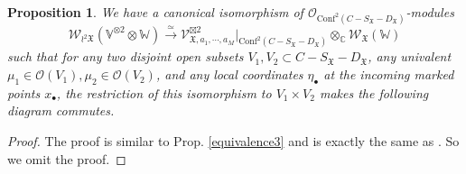 \documentclass[11pt,b5paper,notitlepage]{article}
\theoremstyle{definition}
\theoremstyle{plain}
\newtheorem{pp}[df]{Proposition}
\newcommand{\Conf}{\mathrm{Conf}}
\newcommand{\SV}{\mathscr{V}}
\newcommand{\blt}{\bullet}
\newcommand{\Vbb}{\mathbb V}
\newcommand{\Wbb}{\mathbb W}
\newcommand{\Cbb}{\mathbb C}
\newcommand{\pr}{\mathrm {pr}}
\newcommand{\<}{\left\langle}
\renewcommand{\>}{\right\rangle}
\newcommand{\MO}{\mathcal{O}}
\newcommand{\fx}{\mathfrak{X}}
\newcommand{\SW}{\mathscr{W}}
\numberwithin{equation}{subsection}
\begin{document}
\begin{pp}\label{equivalence4}
    We have a canonical isomorphism of $\MO_{\Conf^2(C-S_\fx-D_\fx)}$-modules
    $$
    \SW_{\wr^2\fx}(\Vbb^{\otimes 2}\otimes \Wbb)\xrightarrow{\simeq} \SV_{\fx,a_1,\cdots,a_M}^{\boxtimes 2}\vert_{\Conf^2(C-S_\fx-D_\fx)}\otimes_\Cbb \SW_\fx(\Wbb)
    $$
    such that for any two disjoint open subsets $V_1,V_2\subset C-S_\fx-D_\fx$, any univalent $\mu_1\in \MO(V_1),\mu_2\in \MO(V_2)$, and any local coordinates $\eta_\blt$ at the incoming marked points $x_\blt$, the restriction of this isomorphism to $V_1\times V_2$ makes the following diagram commutes.
    \begin{center}
\end{center}
\end{pp}
\begin{proof}
    The proof is similar to Prop. \ref{equivalence3} and is exactly the same as \cite[Prop. 8.1]{Gui-propagation}. So we omit the proof.  %
\end{proof}
\end{document}
